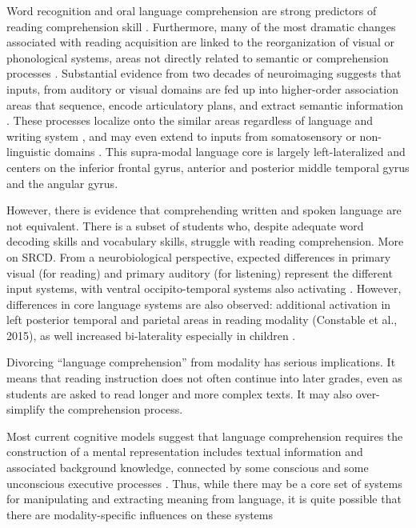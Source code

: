 Word recognition and oral language comprehension are strong predictors of reading comprehension skill \cite{Gough1989}. Furthermore, many of the most dramatic changes associated with reading acquisition are linked to the reorganization of visual or phonological systems, areas not directly related to semantic or comprehension processes \cite{Schlaggar2006, Dahaene2015}. Substantial evidence from two decades of neuroimaging suggests that inputs, from auditory or visual domains are fed up into higher-order association areas that sequence, encode articulatory plans, and extract semantic information \cite{Price2012}. These processes localize onto the similar areas regardless of language and writing system \cite{Rueckl2016}, and may even extend to inputs from somatosensory or non-linguistic domains \cite{Xu2005}. This supra-modal language core is largely left-lateralized and centers on the inferior frontal gyrus, anterior and posterior middle temporal gyrus and the angular gyrus. 

However, there is evidence that comprehending written and spoken language are not equivalent. There is a subset of students who, despite adequate word decoding skills and vocabulary skills, struggle with reading comprehension\citep{Nation2010, Spencer2011}. More on SRCD. From a neurobiological perspective, expected differences in primary visual (for reading) and primary auditory (for listening) represent the different input systems, with ventral occipito-temporal systems also activating \cite{Jobard2007}. However, differences in core language systems are also observed: additional activation in left posterior temporal and parietal areas in reading modality (Constable et al., 2015), as well increased bi-laterality especially in children \cite{Berl2010}. 

Divorcing “language comprehension” from modality has serious implications. It means that reading instruction does not often continue into later grades, even as students are asked to read longer and more complex texts. It may also over-simplify the comprehension process. 

Most current cognitive models suggest that language comprehension requires the construction of a mental representation includes textual information and associated background knowledge, connected by some conscious and some unconscious executive processes \cite{Kendou2014}. Thus, while there may be a core set of systems for manipulating and extracting meaning from language, it is quite possible that there are modality-specific influences on these systems 

